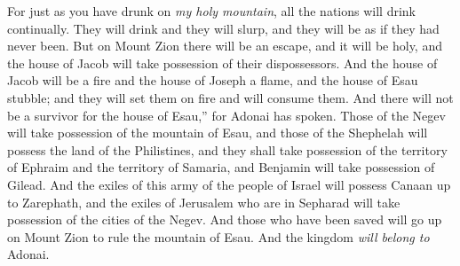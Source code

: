 \begin{biblechapter}
\verse For just as you have drunk on \textit{my holy mountain}, all the nations will drink continually. They will drink and they will slurp, and they will be as if they had never been.
\verse But on Mount Zion there will be an escape, and it will be holy, and the house of Jacob will take possession of their dispossessors.
\verse And the house of Jacob will be a fire and the house of Joseph a flame, and the house of Esau stubble; and they will set them on fire and will consume them. And there will not be a survivor for the house of Esau,” for Adonai has spoken.
 Those of the Negev will take possession of the mountain of Esau, and those of the Shephelah will possess the land of the Philistines, and they shall take possession of the territory of Ephraim and the territory of Samaria, and Benjamin will take possession of Gilead.
\verse And the exiles of this army of the people of Israel will possess Canaan up to Zarephath, and the exiles of Jerusalem who are in Sepharad will take possession of the cities of the Negev.
\verse And those who have been saved will go up on Mount Zion to rule the mountain of Esau. And the kingdom \textit{will belong to} Adonai.
\end{biblechapter}

